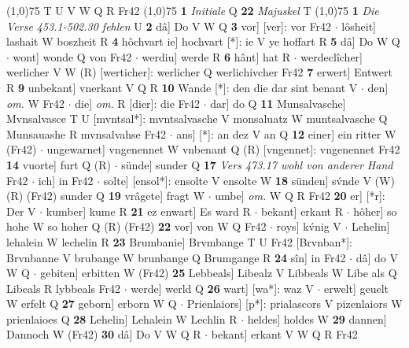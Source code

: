 \documentclass[8pt,a4paper,notitlepage]{article}
\begin{document}
\begin{table}[ht]
\begin{minipage}[t]{0.5\linewidth}
\scriptsize
\line(1,0){75} \newline
T U V W Q R Fr42 \newline
\line(1,0){75} \newline
\textbf{1} \textit{Initiale} Q  \textbf{22} \textit{Majuskel} T  \newline
\line(1,0){75} \newline
\textbf{1} \textit{Die Verse 453.1-502.30 fehlen} U  \textbf{2} dâ] Do V W Q \textbf{3} vor] [ver]: vor Fr42  $\cdot$ lôsheit] lashait W boszheit R \textbf{4} hôchvart ie] hochvart [*]: ie V ye hoffart R \textbf{5} dâ] Do W Q  $\cdot$ wont] wonde Q von Fr42  $\cdot$ werdiu] werde R \textbf{6} hânt] hat R  $\cdot$ werdeclîcher] werlicher V W (R) [werticher]: werlicher  Q werlichivcher Fr42 \textbf{7} erwert] Entwert R \textbf{9} unbekant] vnerkant V Q R \textbf{10} Wande [*]: den die dar sint benant V  $\cdot$ den] \textit{om.} W Fr42  $\cdot$ die] \textit{om.} R [dier]: die Fr42  $\cdot$ dar] do Q \textbf{11} Munsalvasche] Mvnsalvasce T U [mvntsal*]: mvntsalvasche V monsaluatz W muntsalvasche Q Munsauashe R mvnsalvahse Fr42  $\cdot$ ans] [*]: an dez V an Q \textbf{12} einer] ein ritter W (Fr42)  $\cdot$ ungewarnet] vngenennet W vnbenant Q (R) [vngennet]: vngenennet  Fr42 \textbf{14} vuorte] furt Q (R)  $\cdot$ sünde] sunder Q \textbf{17} \textit{Vers 473.17 wohl von anderer Hand} Fr42   $\cdot$ ich] in Fr42  $\cdot$ solte] [ensol*]: ensolte V ensolte W \textbf{18} sünden] sv́nde V (W) (R) (Fr42) sunder Q \textbf{19} vrâgete] fragt W  $\cdot$ umbe] \textit{om.} W Q R Fr42 \textbf{20} er] [*r]: Der V  $\cdot$ kumber] kume R \textbf{21} ez enwart] Es ward R  $\cdot$ bekant] erkant R  $\cdot$ hôher] so hohe W so hoher Q (R) (Fr42) \textbf{22} vor] von W Q Fr42  $\cdot$ roys] kv́nig V  $\cdot$ Lehelin] lehalein W lechelin R \textbf{23} Brumbanie] Brvmbange T U Fr42 [Brvnban*]: Brvnbanne V brubange W brunbange Q Brumgange R \textbf{24} sîn] in Fr42  $\cdot$ dâ] do V W Q  $\cdot$ gebiten] erbitten W (Fr42) \textbf{25} Lebbeals] Libealz V Libbeals W Libe als Q Libeals R lybbeals Fr42  $\cdot$ werde] werld Q \textbf{26} wart] [wa*]: waz V  $\cdot$ erwelt] geuelt W erfelt Q \textbf{27} geborn] erborn W Q  $\cdot$ Prienlaiors] [p*]: prialascors V pizenlaiors W prienlaioes Q \textbf{28} Lehelin] Lehalein W Lechlin R  $\cdot$ heldes] holdes W \textbf{29} dannen] Dannoch W (Fr42) \textbf{30} dâ] Do V W Q R  $\cdot$ bekant] erkant V W Q R Fr42 \newline
\end{minipage}
\end{table}
\end{document}
